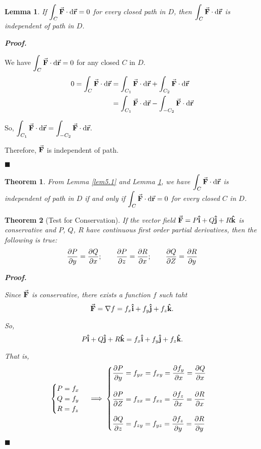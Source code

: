 \documentclass[12pt,a4paper]{article}
\newtheorem{thm}{Theorem}[subsection]
\newtheorem{lem}{Lemma}[section]
\newenvironment*{prf}{\par\indent\textbf{\textit{Proof. }}\par}{\par\hfill$\blacksquare$\par}
\def\dsst{\displaystyle}
\def\R{{\mathbb{R}}}
\def\Q{{\mathbb{Q}}}
\def\d{{\mathrm{d}}}
\def\intC{\dsst\int_C}
\def\vecr{\va{{\textbf{r}}}}
\def\veci{\vu{\boldsymbol{\textbf{i}}}}
\def\vecj{\vu{\boldsymbol{\textbf{j}}}}
\def\veck{\vu{\boldsymbol{\textbf{k}}}}
\def\F{\va{\boldsymbol{\textbf{F}}}}
\begin{document}
\begin{lem}\label{lem5.2}
	If $\intC\F\cdot\d\vecr=0$ for every closed path in $D$, then $\intC\F\cdot\d\vecr$ is independent of path in $D$.
\end{lem}
\begin{prf}
	We have $\intC\F\cdot\d\vecr=0$ for any closed $C$ in $D$. \[\begin{aligned}0=\intC\F\cdot\d\vecr&=\int_{C_1}\F\cdot\d\vecr+\int_{C_2}\F\cdot\d\vecr\\&=\int_{C_1}\F\cdot\d\vecr-\int_{-C_2}\F\cdot\d\vecr\end{aligned}\]\par So, $\dsst\int_{C_1}\F\cdot\d\vecr=\int_{-C_2}\F\cdot\d\vecr.$\par Therefore, $\F$ is independent of path. 
\end{prf}
\begin{thm}\label{thm5.3.4}
	From Lemma \ref{lem5.1} and Lemma \ref{lem5.2}, we have $\intC\F\cdot\d\vecr$ is independent of path in $D$ if and only if $\intC\F\cdot\d\vecr=0$ for every closed $C$ in $D$. 
\end{thm}
\begin{thm}[Test for Conservation]\label{thm5.3.5}
	If the vector field $\F=P\veci+Q\vecj+R\veck$ is conservative and $P$, $Q$, $R$ have continuous first order partial derivatives, then the following is true: \[\pdv{P}{y}=\pdv{Q}{x};\qquad\pdv{P}{z}=\pdv{R}{x};\qquad\pdv{Q}{Z}=\pdv{R}{y}\]
	\begin{prf}
	Since $\F$ is conservative, there exists a function $f$ such taht \[\F=\nabla f=f_x\veci+f_y\vecj+f_z\veck.\]\par So, \[P\veci+Q\vecj+R\veck=f_x\veci+f_y\vecj+f_z\veck.\]\par That is, \[\begin{cases}P=f_x\\Q=f_y\\R=f_z\end{cases}\implies\begin{cases}\dsst\pdv{P}{y}=f_{yx}=f_{xy}=\pdv{f_y}{x}=\pdv{Q}{x}\\\\\dsst\pdv{P}{Z}=f_{zx}=f_{xz}=\pdv{f_z}{x}=\pdv{R}{x}\\\\\dsst\pdv{Q}{z}=f_{zy}=f_{yz}=\pdv{f_z}{y}=\pdv{R}{y}\end{cases}\]
	\end{prf}
\end{thm}
\end{document}
